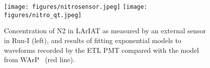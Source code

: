 \begin{figure}
\texttt{[image: figures/nitrosensor.jpeg]}
\hspace{0.5cm}
\texttt{[image: figures/nitro\_qt.jpeg]}
\label{light_nitro}
\caption{Concentration of N2 in LArIAT as measured by an external sensor in Run-I (left), and results of fitting exponential models to waveforms recorded by the ETL PMT compared with the model from WArP~\cite{WARP-nitrogen} (red line).}
\end{figure}
